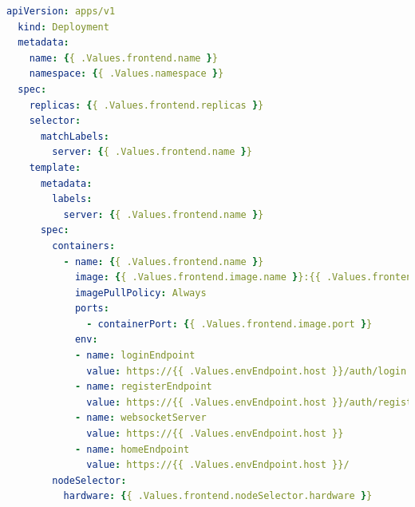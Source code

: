 \begin{lstlisting}[caption={cert.yaml \cite{certmanageracme} },captionpos=b,label={lst:cert},language=yaml]
  apiVersion: apps/v1
  kind: Deployment
  metadata:
    name: {{ .Values.frontend.name }}
    namespace: {{ .Values.namespace }}
  spec:
    replicas: {{ .Values.frontend.replicas }}
    selector:
      matchLabels:
        server: {{ .Values.frontend.name }}
    template:
      metadata:
        labels:
          server: {{ .Values.frontend.name }}
      spec:
        containers:
          - name: {{ .Values.frontend.name }}
            image: {{ .Values.frontend.image.name }}:{{ .Values.frontend.image.tag }}
            imagePullPolicy: Always
            ports:
              - containerPort: {{ .Values.frontend.image.port }}
            env:
            - name: loginEndpoint
              value: https://{{ .Values.envEndpoint.host }}/auth/login
            - name: registerEndpoint
              value: https://{{ .Values.envEndpoint.host }}/auth/register
            - name: websocketServer
              value: https://{{ .Values.envEndpoint.host }}
            - name: homeEndpoint
              value: https://{{ .Values.envEndpoint.host }}/
        nodeSelector:
          hardware: {{ .Values.frontend.nodeSelector.hardware }}

\end{lstlisting}


